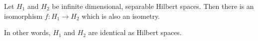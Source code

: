 \documentclass[12pt]{article}
\begin{document}
Let $H_1$ and $H_2$ be infinite dimensional, separable Hilbert spaces.  Then there is an isomorphism $f:H_1\rightarrow H_2$ which is also an isometry.

In other words, $H_1$ and $H_2$ are identical as Hilbert spaces.
\end{document}
